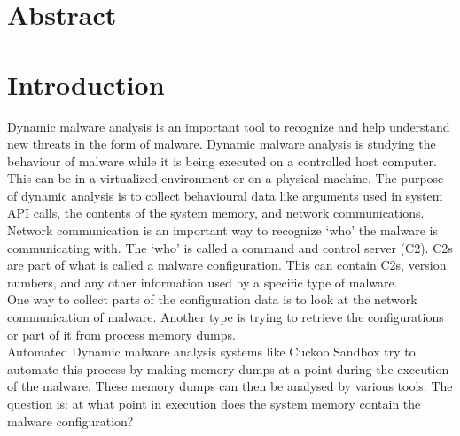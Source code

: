\documentclass[conference]{IEEEtran}
\begin{document}
\clearpage
\twocolumn
\thispagestyle{plain}
\pagestyle{plain}
\section{Abstract}
\clearpage





%
\IEEEpeerreviewmaketitle



\section{Introduction}
Dynamic malware analysis is an important tool to recognize and help understand new threats in the form of malware. 
Dynamic malware analysis is studying the behaviour of malware while it is being executed on a controlled host computer. This can be in a virtualized environment or on a physical machine. The purpose of dynamic analysis is to collect behavioural data like arguments used in system API calls, the contents of the system memory, and network communications. Network communication is an important way to recognize ‘who’ the malware is communicating with. The ‘who’ is called a command and control server (\Gls{C2}). C2s are part of what is called a malware configuration. This can contain C2s, version numbers, and any other information used by a specific type of malware.\\

One way to collect parts of the \Gls{configuration data} is to look at the network communication of malware. Another type is trying to retrieve the configurations or part of it from process memory dumps.\\

Automated Dynamic malware analysis systems like Cuckoo Sandbox try to automate this process by making memory dumps at a point during the execution of the malware. These memory dumps can then be analysed by various tools. The question is: at what point in execution does the system memory contain the malware configuration?\\
\end{document}
